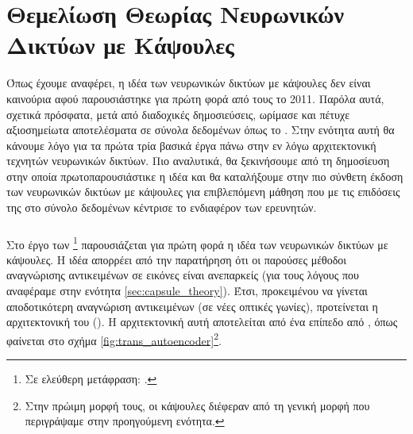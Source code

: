 \section{Θεμελίωση Θεωρίας Νευρωνικών Δικτύων με Κάψουλες}

Όπως έχουμε αναφέρει, η ιδέα των νευρωνικών δικτύων με κάψουλες δεν είναι καινούρια αφού παρουσιάστηκε για πρώτη φορά από τους  το 2011. Παρόλα αυτά, σχετικά πρόσφατα, μετά από διαδοχικές δημοσιεύσεις, ωρίμασε και πέτυχε αξιοσημείωτα αποτελέσματα σε σύνολα δεδομένων όπως το \cite{sabour2017dynamic}. Στην ενότητα αυτή θα κάνουμε λόγο για τα πρώτα τρία βασικά έργα πάνω στην εν λόγω αρχιτεκτονική τεχνητών νευρωνικών δικτύων. Πιο αναλυτικά, θα ξεκινήσουμε από τη δημοσίευση στην οποία πρωτοπαρουσιάστικε η ιδέα και θα καταλήξουμε στην πιο σύνθετη έκδοση των νευρωνικών δικτύων με κάψουλες για επιβλεπόμενη μάθηση που με τις επιδόσεις της στο σύνολο δεδομένων \cite{lecun2004learning} κέντρισε το ενδιαφέρον των ερευνητών. 

\subsubsection{}

Στο έργο των \footnote{Σε ελεύθερη μετάφραση: .} \cite{hinton2011transforming} παρουσιάζεται για πρώτη φορά η ιδέα των νευρωνικών δικτύων με κάψουλες. Η ιδέα απορρέει από την παρατήρηση ότι οι παρούσες μέθοδοι αναγνώρισης αντικειμένων σε εικόνες είναι ανεπαρκείς (για τους λόγους που αναφέραμε στην ενότητα \ref{sec:capsule_theory}). Έτσι, προκειμένου να γίνεται αποδοτικότερη αναγνώριση αντικειμένων (σε νέες οπτικές γωνίες), προτείνεται η αρχιτεκτονική του  (). Η αρχιτεκτονική αυτή αποτελείται από ένα επίπεδο από , όπως φαίνεται στο σχήμα \ref{fig:trans_autoencoder}\footnote{Στην πρώιμη μορφή τους, οι κάψουλες διέφεραν από τη γενική μορφή που περιγράψαμε στην προηγούμενη ενότητα.}.\par

